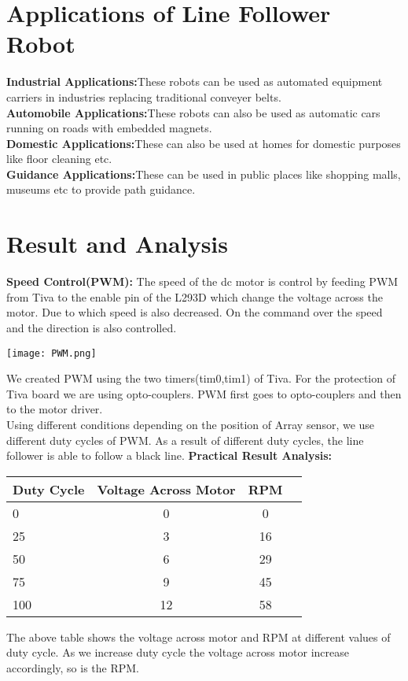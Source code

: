 \documentclass[12pt]{article}
\begin{document}
\bigbreak

\section{Applications of Line Follower Robot}
\textbf{
Industrial Applications:}These robots can be used as automated equipment carriers in industries replacing traditional conveyer belts.\\
\textbf{
Automobile Applications:}These robots can also be used as automatic cars running on roads with embedded magnets.\\
\textbf{
Domestic Applications:}These can also be used at homes for domestic purposes like floor cleaning etc.\\
\textbf{
Guidance Applications:}These can be used in public places like shopping malls, museums etc to provide path guidance.\\

\section{Result and Analysis}
\textbf{
Speed Control(PWM):}
The speed of the dc motor is control by feeding PWM from Tiva to the enable pin of the L293D which change the voltage across the motor. Due to which speed is also decreased. On the command over the speed and the direction is also controlled. 
\begin{center}
\bigbreak
\texttt{[image: PWM.png]}\\
\end{center}
\bigbreak
\bigbreak
\bigbreak
\bigbreak
\bigbreak
\bigbreak

We created PWM using the two timers(tim0,tim1) of Tiva. For the protection of Tiva board we are using opto-couplers. PWM first goes to opto-couplers and then to the motor driver.\\

Using different conditions depending on the position of Array sensor, we use different duty cycles of PWM. As a result of different duty cycles, the line follower is able to follow a black line.
\bigbreak
\textbf{
Practical Result Analysis:}
\begin{center}
\begin{tabular}{|l|c|c|r|}
\hline
\textbf {Duty Cycle} & \textbf Voltage Across Motor  &\textbf{RPM} \\
\hline
0 & 0 & 0 \\
25 & 3 & 16 \\
50 & 6 & 29 \\
75 & 9 & 45\\
100 & 12 & 58\\
\hline
\end{tabular}
\bigbreak
\end{center}
The above table shows the voltage across motor and RPM at different values of duty cycle. As we increase duty cycle the voltage across motor increase accordingly, so is the RPM.
\newpage
\end{document}
